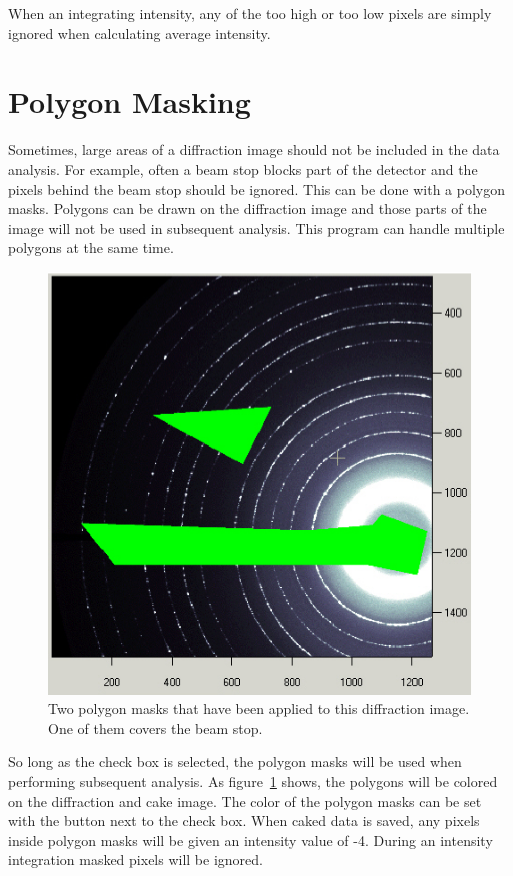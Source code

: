 When an integrating intensity, 
any of the too high or too low pixels are simply ignored when 
calculating average intensity. 

\section{Polygon Masking}

Sometimes, large areas of a diffraction image should not
be included in the data analysis. For example, 
often a beam stop blocks part of the detector
and the pixels behind the beam stop should be ignored. 
This can be done with a polygon masks. Polygons can be drawn 
on the diffraction image and those parts 
of the image will not be used in subsequent analysis. 
This program can handle multiple polygons at the same time.

\begin{figure}
    \centering
    \includegraphics[scale=.75]{figures/Displayed_Polygon.eps}
    \caption{Two polygon masks that have been applied
    to this diffraction image. One of them covers the beam stop.}
    \label{Displayed_Polygon}
\end{figure}

So long as the  check box is
selected, the polygon masks will be used 
when performing subsequent analysis. 
As figure~\ref{Displayed_Polygon} shows,
the polygons will be colored on the diffraction and
cake image.  The color of the polygon masks can be set 
with the  button
next to the  check box.
When caked data is saved, any pixels inside 
polygon masks will be given an intensity 
value of -4. During an intensity integration 
masked pixels will be ignored.

